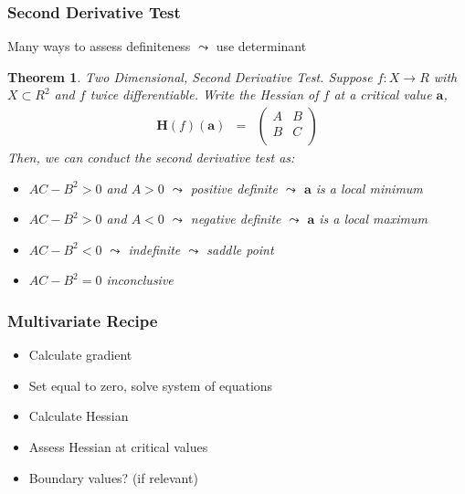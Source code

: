 \documentclass{beamer}
\newtheorem{thm}{Theorem}
\numberwithin{equation}{section}
\begin{document}
\begin{frame}
\frametitle{Second Derivative Test} 

Many ways to assess definiteness $\leadsto$ use determinant \pause

\begin{thm} 
Two Dimensional, Second Derivative Test.  Suppose $f:X \rightarrow R$ with $X \subset R^{2}$ and $f$ twice differentiable.  Write the Hessian of $f$ at a critical value $\boldsymbol{a}$, 
\begin{eqnarray}
\boldsymbol{H}(f)(\boldsymbol{a}) & = & \begin{pmatrix} 
	A & B \\
	B & C \\
	\end{pmatrix} \nonumber 
	\end{eqnarray}
Then, we can conduct the second derivative test as:
\begin{itemize}
\item[-] $AC - B^2> 0$ and $A>0$ $\leadsto$ positive definite $\leadsto$ $\boldsymbol{a}$ is a local minimum 
\item[-] $AC - B^2> 0 $ and $A<0$ $\leadsto$ negative definite $\leadsto$ $\boldsymbol{a}$ is a local maximum
\item[-] $AC - B^2<0 $ $\leadsto$ indefinite $\leadsto$ saddle point 
\item[-] $AC- B^2 = 0$ inconclusive
\end{itemize}
	
\end{thm}

\end{frame}



\begin{frame}
\frametitle{Multivariate Recipe}

\begin{itemize}
\item[1)] Calculate gradient \pause
\item[2)] Set equal to zero, solve system of equations \pause
\item[3)] Calculate Hessian \pause
\item[4)] Assess Hessian at critical values \pause
\item[5)] Boundary values?  (if relevant)
\end{itemize}

\end{frame}
\end{document}
